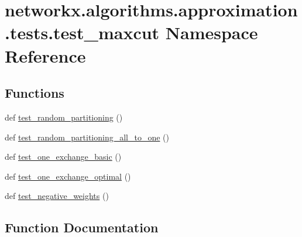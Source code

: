 \hypertarget{namespacenetworkx_1_1algorithms_1_1approximation_1_1tests_1_1test__maxcut}{}\section{networkx.\+algorithms.\+approximation.\+tests.\+test\+\_\+maxcut Namespace Reference}
\label{namespacenetworkx_1_1algorithms_1_1approximation_1_1tests_1_1test__maxcut}
\subsection*{Functions}
\begin{DoxyCompactItemize}
\item 
def \hyperlink{namespacenetworkx_1_1algorithms_1_1approximation_1_1tests_1_1test__maxcut_ad0610f9b7c2e62580a6a37c0d093cc98}{test\+\_\+random\+\_\+partitioning} ()
\item 
def \hyperlink{namespacenetworkx_1_1algorithms_1_1approximation_1_1tests_1_1test__maxcut_ab0d0336f468ee362f80ee9be7b9d6497}{test\+\_\+random\+\_\+partitioning\+\_\+all\+\_\+to\+\_\+one} ()
\item 
def \hyperlink{namespacenetworkx_1_1algorithms_1_1approximation_1_1tests_1_1test__maxcut_a4917c3dd0e8d1f2264a94e50e11506f9}{test\+\_\+one\+\_\+exchange\+\_\+basic} ()
\item 
def \hyperlink{namespacenetworkx_1_1algorithms_1_1approximation_1_1tests_1_1test__maxcut_a764c947111f81440b2d5b77f45c22f40}{test\+\_\+one\+\_\+exchange\+\_\+optimal} ()
\item 
def \hyperlink{namespacenetworkx_1_1algorithms_1_1approximation_1_1tests_1_1test__maxcut_a0d97dd9c6fce53e151223d43ae37c05e}{test\+\_\+negative\+\_\+weights} ()
\end{DoxyCompactItemize}


\subsection{Function Documentation}
\mbox{\label{namespacenetworkx_1_1algorithms_1_1approximation_1_1tests_1_1test__maxcut_a0d97dd9c6fce53e151223d43ae37c05e}} 
